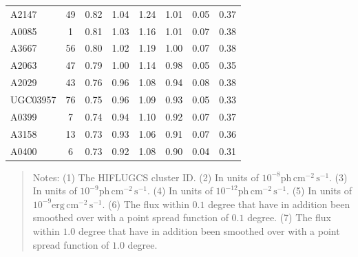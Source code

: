 \documentclass[10pt,aps,pra,reprint,amsmath,amsfonts,amssymb,showpacs,nofootinbib,floatfix]{revtex4-1}
\newcommand{\rmn}{\mathrm}
\begin{document}
\begin{table}
\begin{minipage}{2.0\columnwidth}
\begin{tabular}{l  c c c c c c c}
A2147    &  49 &   0.82 &   1.04 &   1.24 &   1.01 &   0.05 &   0.37 \\
A0085    &   1 &   0.81 &   1.03 &   1.16 &   1.01 &   0.07 &   0.38 \\
A3667    &  56 &   0.80 &   1.02 &   1.19 &   1.00 &   0.07 &   0.38 \\
A2063    &  47 &   0.79 &   1.00 &   1.14 &   0.98 &   0.05 &   0.35 \\
A2029    &  43 &   0.76 &   0.96 &   1.08 &   0.94 &   0.08 &   0.38 \\
UGC03957 &  76 &   0.75 &   0.96 &   1.09 &   0.93 &   0.05 &   0.33 \\
A0399    &   7 &   0.74 &   0.94 &   1.10 &   0.92 &   0.07 &   0.37 \\
A3158    &  13 &   0.73 &   0.93 &   1.06 &   0.91 &   0.07 &   0.36 \\
A0400    &   6 &   0.73 &   0.92 &   1.08 &   0.90 &   0.04 &   0.31 \\
\hline
\hline
\end{tabular}
\begin{quote}
  Notes: 
   (1) The HIFLUGCS cluster ID.
   (2) In units of  $10^{-8} \rmn{ph}\,\rmn{cm}^{-2}\,\rmn{s}^{-1}$.
   (3) In units of  $10^{-9} \rmn{ph}\,\rmn{cm}^{-2}\,\rmn{s}^{-1}$.
   (4) In units of  $10^{-12} \rmn{ph}\,\rmn{cm}^{-2}\,\rmn{s}^{-1}$.
   (5) In units of  $10^{-9} \rmn{erg}\,\rmn{cm}^{-2}\,\rmn{s}^{-1}$.
   (6) The flux within $0.1$ degree that have in addition been smoothed over with a point spread function of $0.1$ degree. 
   (7) The flux within $1.0$ degree that have in addition been smoothed over with a point spread function of $1.0$ degree. 
 \label{tab:flux_tab_LP}
  \end{quote}
\end{minipage}
\end{table} 
\end{document}
